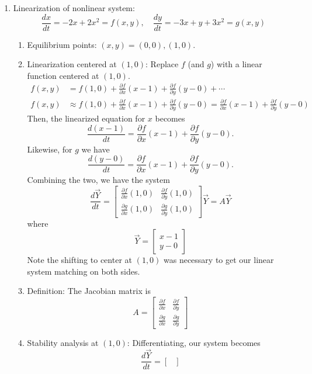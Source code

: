 \documentclass{article}
\begin{document}
\begin{enumerate}
\item Linearization of nonlinear system:
\[
\frac{dx}{dt} = -2x+2x^2 = f(x,y), \quad \frac{dy}{dt}=-3x+y+3x^2 = g(x,y)
\]
\begin{enumerate}
\item Equilibrium points: $(x,y)=(0,0), (1,0)$.
\item Linearization centered at $(1,0)$: Replace $f$ (and $g$) with a linear function centered at $(1,0)$.
\begin{align*}
f(x,y) &= f(1,0) + \frac{\partial f}{\partial x} (x-1) +  \frac{\partial f}{\partial y} (y-0)  + \cdots \\
f(x,y) &\approx f(1,0) + \frac{\partial f}{\partial x} (x-1) + \frac{\partial f}{\partial y} (y-0) = \frac{\partial f}{\partial x} (x-1) +  \frac{\partial f}{\partial y} (y-0)
\end{align*}
Then, the linearized equation for $x$ becomes
\[
\frac{d(x-1)}{dt} = \frac{\partial f}{\partial x} (x-1) +  \frac{\partial f}{\partial y} (y-0).
\]
Likewise, for $g$ we have
\[
\frac{d(y-0)}{dt} = \frac{\partial f}{\partial x} (x-1) +  \frac{\partial f}{\partial y} (y-0).
\]
Combining the two, we have the system
\[
\frac{d \vec{Y}}{dt} = \begin{bmatrix}
\frac{\partial f}{\partial x}(1,0)  & \frac{\partial f}{\partial y}(1,0)  \\
\frac{\partial g}{\partial x}(1,0)  & \frac{\partial g}{\partial y}(1,0)  
\end{bmatrix} \vec{Y} = A\vec{Y}
\]
where 
\[
 \vec{Y} = \begin{bmatrix}
 x-1 \\ y-0
 \end{bmatrix}
\]
Note the shifting to center at $(1,0)$ was necessary to get our linear system matching on both sides.
\item Definition: The Jacobian matrix is
\[ A = 
\begin{bmatrix}
\frac{\partial f}{\partial x}  & \frac{\partial f}{\partial y} \\
\frac{\partial g}{\partial x}  & \frac{\partial g}{\partial y}  
\end{bmatrix}
\]
\item Stability analysis at $(1,0)$: Differentiating, our system becomes
\[
\frac{d \vec{Y}}{dt} = \begin{bmatrix}

\end{bmatrix}\]
\end{enumerate}
\end{enumerate}
\end{document}
